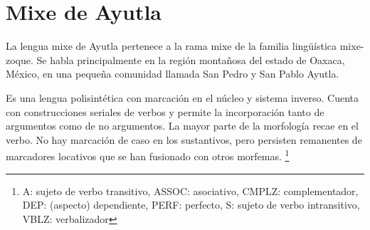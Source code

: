 \section*{Mixe de Ayutla}

\noindent La lengua mixe de Ayutla pertenece a la rama mixe de la familia lingüística mixe-zoque. Se habla principalmente en la región montañosa del estado de Oaxaca, México, en una pequeña comunidad llamada San Pedro y San Pablo Ayutla. 

Es una lengua polisintética con marcación en el núcleo y sistema inverso. Cuenta con construcciones seriales de verbos y permite la incorporación tanto de argumentos como de no argumentos. La mayor parte de la morfología recae en el verbo. No hay marcación de caso en los sustantivos, pero persisten remanentes de marcadores locativos que se han fusionado con otros morfemas. 
\footnote{A: sujeto de verbo transitivo, ASSOC: asociativo, CMPLZ: complementador, DEP: (aspecto) dependiente, PERF: perfecto, S: sujeto de verbo intransitivo, VBLZ: verbalizador}
\vspace{0.5cm}
